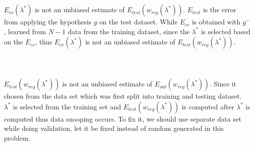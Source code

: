 \documentclass[12pt]{article}
\begin{document}
 \\\\
\indent $E_{cv}(\lambda^*)$ is not an unbiased estimate of $E_{test}( {w}_{reg}(\lambda^*))$. $E_{test}$ is the error from applying the hypothesis $g$ on the test dataset. While $E_{cv}$ is obtained with $g^-$, learned from $N-1$ data from the training dataset, since the $\lambda^*$ is selected based on the $E_{cv}$, thus $E_{cv}(\lambda^*)$ is not an unbiased estimate of $E_{test}( {w}_{reg}(\lambda^*))$.\\\\

 \\\\
\indent $E_{test}( {w}_{reg}(\lambda^*))$ is not an unbiased estimate of $E_{out}( {w}_{reg}(\lambda^*))$. Since it chosen from the data set which was first split into training and testing dataset. $\lambda^*$ is selected from the training set and  $E_{test}( {w}_{reg}(\lambda^*))$ is computed after $\lambda^*$ is computed thus data snooping occurs. To fix it, we should use separate data set while doing validation, let it be fixed instead of random generated in this problem.
\end{document}
